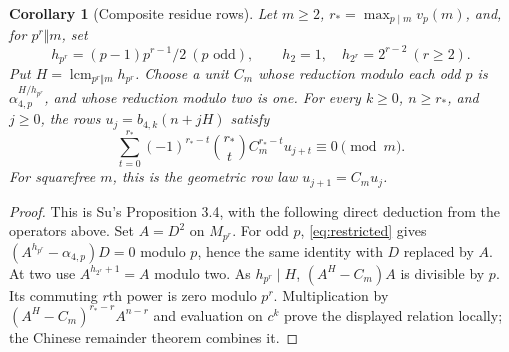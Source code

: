 \documentclass[11pt]{article}
\newtheorem{corollary}{Corollary}
\begin{document}
\begin{corollary}[Composite residue rows]\label{cor:rows}
Let $m\ge2$, $r_* =\max_{p\mid m}v_p(m)$, and, for $p^r\Vert m$, set
\[
 h_{p^r}=(p-1)p^{r-1}/2\ (p\text{ odd}),\qquad
 h_2=1,\quad h_{2^r}=2^{r-2}\ (r\ge2).
\]
Put $H=\operatorname{lcm}_{p^r\Vert m}h_{p^r}$.
Choose a unit $C_m$ whose reduction modulo each odd $p$ is
$\alpha_{4,p}^{H/h_{p^r}}$, and whose reduction modulo two is one.
For every $k\ge0$, $n\ge r_*$, and $j\ge0$, the rows
$u_j=b_{4,k}(n+jH)$ satisfy
\[
 \sum_{t=0}^{r_*}(-1)^{r_*-t}\binom{r_*}{t}C_m^{r_*-t}u_{j+t}
 \equiv0\pmod m.
\]
For squarefree $m$, this is the geometric row law $u_{j+1}=C_mu_j$.
\end{corollary}
\begin{proof}
This is Su's Proposition 3.4, with the following direct deduction from the
operators above. Set $A=D^2$ on $M_{p^r}$.
For odd $p$, \eqref{eq:restricted} gives
$(A^{h_{p^r}}-\alpha_{4,p})D=0$ modulo $p$, hence the same identity with
$D$ replaced by $A$. At two use $A^{h_{2^r}+1}=A$ modulo two.
As $h_{p^r}\mid H$, $(A^H-C_m)A$ is divisible by $p$.
Its commuting $r$th power is zero modulo $p^r$.
Multiplication by $(A^H-C_m)^{r_*-r}A^{n-r}$ and evaluation on $c^k$
prove the displayed relation locally; the Chinese remainder theorem combines it.
\end{proof}
\end{document}
